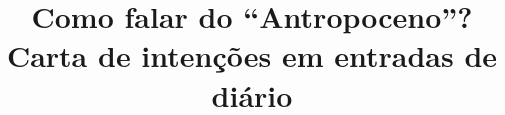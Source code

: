 \title{Como falar do ``Antropoceno''?\\
\normalfont\large Carta de intenções em entradas de diário}
\author{}
\date{}
